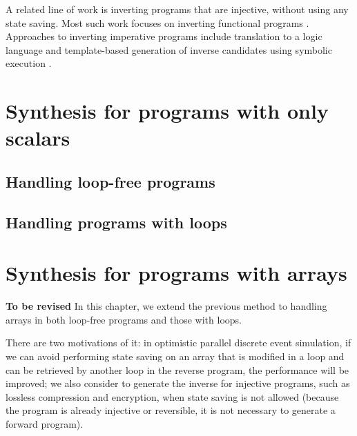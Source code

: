 \documentclass[12pt]{gatech-thesis}
\newcommand{\TODO}[1]{{\color{red}\textbf{#1}}}
\begin{document}
A related line of work is inverting programs that are injective, without using any state saving.
Most such work focuses on inverting functional programs \cite{Abramov2002a,Gluck2005,Kawabe2005}.
Approaches to inverting imperative programs include translation to a logic language \cite{Ross1997} and template-based generation of inverse candidates using symbolic execution \cite{Srivastava2011}.




\chapter{Synthesis for programs with only scalars}


\section{Handling loop-free programs}
\label{sec:scalar-loop-free}


\section{Handling programs with loops}
\label{sec:scalar-loops}





\chapter{Synthesis for programs with arrays}
\label{chapter:arrays-loop-free}

\TODO{To be revised}
In this chapter, we extend the previous method to handling arrays in both loop-free programs and those with loops.

There are two motivations of it: in optimistic  parallel discrete event simulation, if we can avoid performing state saving on an array that is modified in a loop and can be retrieved by another loop in the reverse program, the performance will be improved; 
we also consider to generate the inverse for injective programs, such as lossless compression and encryption,  when state saving is not allowed (because the program is already injective or reversible, it is not necessary to generate a forward program). 
\end{document}
